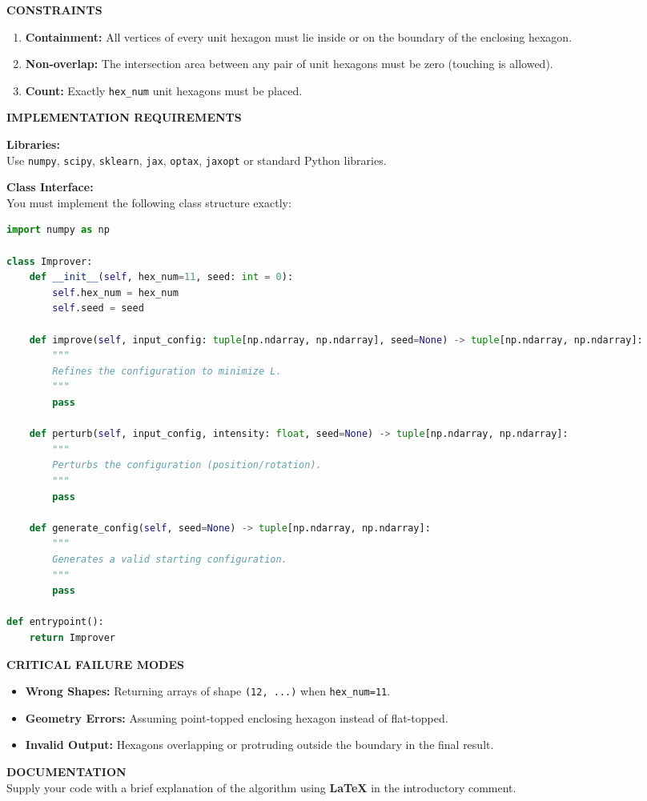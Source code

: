 \documentclass[sigconf]{acmart}
\begin{document}
\begin{paracol}{2}
\vspace{0.3cm}
\noindent \textbf{CONSTRAINTS}
\begin{enumerate}
    \item \textbf{Containment:} All vertices of every unit hexagon must lie inside or on the boundary of the enclosing hexagon.
    \item \textbf{Non-overlap:} The intersection area between any pair of unit hexagons must be zero (touching is allowed).
    \item \textbf{Count:} Exactly \texttt{hex\_num} unit hexagons must be placed.
\end{enumerate}

\vspace{0.3cm}
\noindent \textbf{IMPLEMENTATION REQUIREMENTS}

\noindent \textbf{Libraries:}\\
Use \texttt{numpy}, \texttt{scipy}, \texttt{sklearn}, \texttt{jax}, \texttt{optax}, \texttt{jaxopt} or standard Python libraries.

\noindent \textbf{Class Interface:}\\
You must implement the following class structure exactly:

\begin{lstlisting}[language=Python, basicstyle=\ttfamily\scriptsize, frame=single]
import numpy as np

class Improver:
    def __init__(self, hex_num=11, seed: int = 0):
        self.hex_num = hex_num
        self.seed = seed

    def improve(self, input_config: tuple[np.ndarray, np.ndarray], seed=None) -> tuple[np.ndarray, np.ndarray]:
        """
        Refines the configuration to minimize L.
        """
        pass

    def perturb(self, input_config, intensity: float, seed=None) -> tuple[np.ndarray, np.ndarray]:
        """
        Perturbs the configuration (position/rotation).
        """
        pass

    def generate_config(self, seed=None) -> tuple[np.ndarray, np.ndarray]:
        """
        Generates a valid starting configuration.
        """
        pass

def entrypoint():
    return Improver
\end{lstlisting}

\noindent \textbf{CRITICAL FAILURE MODES}
\begin{itemize}
    \item \textbf{Wrong Shapes:} Returning arrays of shape \texttt{(12, ...)} when \texttt{hex\_num=11}.
    \item \textbf{Geometry Errors:} Assuming point-topped enclosing hexagon instead of flat-topped.
    \item \textbf{Invalid Output:} Hexagons overlapping or protruding outside the boundary in the final result.
\end{itemize}

\noindent \textbf{DOCUMENTATION}\\
Supply your code with a brief explanation of the algorithm using \textbf{LaTeX} in the introductory comment.
\end{paracol}
\end{document}
